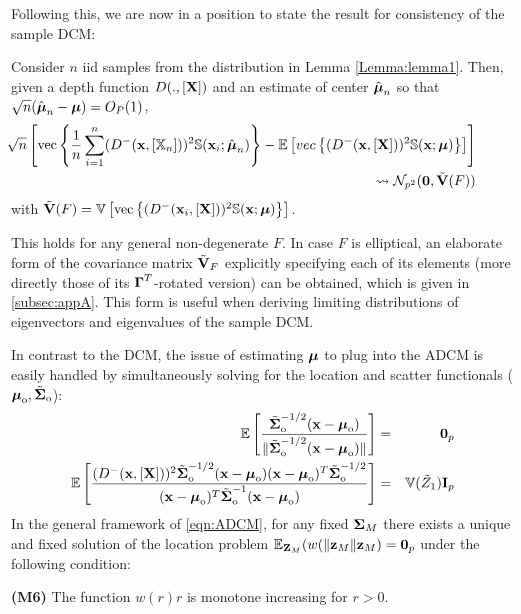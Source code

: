 Following this, we are now in a position to state the result for consistency of the sample DCM:

\begin{Theorem} \label{Theorem:rootn}
Consider $n$ iid samples from the distribution in Lemma \ref{Lemma:lemma1}. Then, given a depth function $D(., [{\mathbf{X}}])$ and an estimate of center $\hat{{\boldsymbol{\mu}}}_n$ so that $\sqrt n(\hat {{\boldsymbol{\mu}}}_n - {\boldsymbol{\mu}}) = O_P(1)$,
%
\begin{eqnarray}
&& \hspace{-4em} \sqrt n \left[ \ve \left\{ \frac{1}{n} \sum_{i=1}^n (D^- (\bfx, [\BX_n]))^2 \BS(\bfx_i; \hat\bfmu_n) \right\} - \BE \left[ vec\left\{ (D^- (\bfx, [\bfX]))^2 \BS(\bfx; \bfmu) \right\} \right] \right] \\\notag
&& \leadsto \cN_{p^2} ({\bf 0}, \tilde \bfV (F))
\end{eqnarray}
%
with $\tilde {{\mathbf{V}}} (F) = {\mathbb{V}} \left[ \operatorname*{vec} \left\{ (D^- ({\bf{x}}_i, [{\mathbf{X}}]))^2 {\mathbb{S}}({\bf{x}}; {\boldsymbol{\mu}}) \right\} \right]$.
\end{Theorem}

\noindent This holds for any general non-degenerate $F$. In case $F$ is elliptical, an elaborate form of the covariance matrix $\tilde {{\mathbf{V}}}_F$ explicitly specifying each of its elements (more directly those of its ${\boldsymbol{\Gamma}}^T$-rotated version) can be obtained, which is given in \ref{subsec:appA}. This form is useful when deriving limiting distributions of eigenvectors and eigenvalues of the sample DCM.

In contrast to the DCM, the issue of estimating ${\boldsymbol{\mu}}$ to plug into the ADCM is easily handled by simultaneously solving for the location and scatter functionals (${\boldsymbol{\mu}}_{\text{o}}, \tilde {{\boldsymbol{\Sigma}}}_{\text{o}}$):
%
\begin{eqnarray}
{\mathbb{E}} \left[ \frac{\tilde {{\boldsymbol{\Sigma}}}_{\text{o}}^{-1/2} ({\bf{x}} - {\boldsymbol{\mu}}_{\text{o}})}{ \| \tilde {{\boldsymbol{\Sigma}}}_{\text{o}}^{-1/2}({\bf{x}} - {\boldsymbol{\mu}}_{\text{o}}) \|} \right] &=& {\bf 0}_p \label{eqn:AffineMedian}\\
{\mathbb{E}} \left[ \frac{( D^- ({\bf{x}}, [{\mathbf{X}}] ) )^2 \tilde {{\boldsymbol{\Sigma}}}_{\text{o}}^{-1/2} ({\bf{x}} - {\boldsymbol{\mu}}_{\text{o}}) ({\bf{x}} - {\boldsymbol{\mu}}_{\text{o}})^T \tilde {{\boldsymbol{\Sigma}}}_{\text{o}}^{-1/2}}{({\bf{x}} - {\boldsymbol{\mu}}_{\text{o}})^T \tilde {{\boldsymbol{\Sigma}}}_{\text{o}}^{-1} ({\bf{x}} - {\boldsymbol{\mu}}_{\text{o}})} \right] &=& {\mathbb{V}}(\tilde Z_1) {\mathbf{I}}_p \label{eqn:AffineCov}
\end{eqnarray}
%
In the general framework of \ref{eqn:ADCM}, for any fixed ${\boldsymbol{\Sigma}}_M$ there exists a unique and fixed solution of the location problem ${\mathbb{E}}_{{\mathbf{Z}}_M} (w(\| {\bf{z}}_M \| {\bf{z}}_M) = {\bf 0}_p $ under the following condition:

\vspace{1em}
\noindent\textbf{(M6)} The function $w(r)r$ is monotone increasing for $r>0$.


